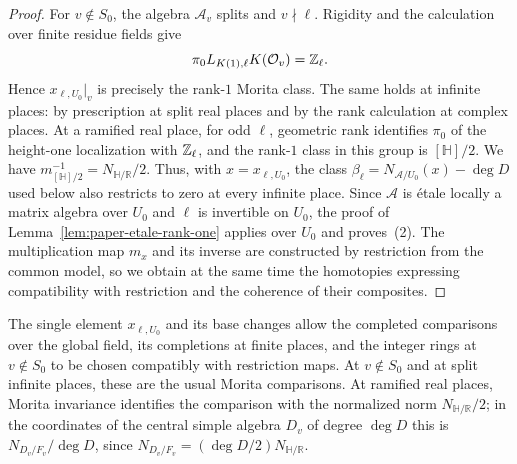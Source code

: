 \begin{proof}
For $v\notin S_0$, the algebra $\mathcal A_v$ splits and $v\nmid\ell$.
Rigidity and the calculation over finite residue fields give
\[
 \pi_0L_{K(1),\ell}K(\mathcal O_v)=\mathbb Z_\ell.
\]
Hence $x_{\ell,U_0}|_v$ is precisely the rank-$1$ Morita class.
The same holds at infinite places: by prescription at split real places and by the rank calculation at complex places.
At a ramified real place, for odd $\ell$, geometric rank identifies $\pi_0$ of the height-one localization with $\mathbb Z_\ell$, and the rank-$1$ class in this group is $[\mathbb H]/2$.
We have $m_{[\mathbb H]/2}^{-1}=N_{\mathbb H/\mathbb R}/2$.
Thus, with $x=x_{\ell,U_0}$, the class $\beta_\ell=N_{\mathcal A/U_0}(x)-\deg D$ used below also restricts to zero at every infinite place.
Since $\mathcal A$ is \'etale locally a matrix algebra over $U_0$ and $\ell$ is invertible on $U_0$, the proof of Lemma~\ref{lem:paper-etale-rank-one} applies over $U_0$ and proves~(2).
The multiplication map $m_x$ and its inverse are constructed by restriction from the common model, so we obtain at the same time the homotopies expressing compatibility with restriction and the coherence of their composites.
\end{proof}

The single element $x_{\ell,U_0}$ and its base changes allow the completed comparisons over the global field, its completions at finite places, and the integer rings at $v\notin S_0$ to be chosen compatibly with restriction maps.
At $v\notin S_0$ and at split infinite places, these are the usual Morita comparisons.
At ramified real places, Morita invariance identifies the comparison with the normalized norm $N_{\mathbb H/\mathbb R}/2$; in the coordinates of the central simple algebra $D_v$ of degree $\deg D$ this is $N_{D_v/F_v}/\deg D$, since $N_{D_v/F_v}=(\deg D/2)N_{\mathbb H/\mathbb R}$.

